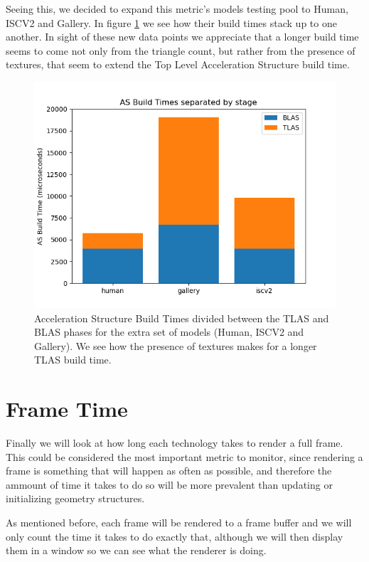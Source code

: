 Seeing this, we decided to expand this metric's models testing pool to Human, ISCV2 and Gallery. In figure \ref{as-extra-build-time-decomposed} we see how their build times stack up to one another. In sight of these new data points we appreciate that a longer build time seems to come not only from the triangle count, but rather from the presence of textures, that seem to extend the Top Level Acceleration Structure build time.


\begin{figure}[hbt!]
    \centering
    \includegraphics[width=1.0\textwidth]{figuras/optix-extra-accelbuildtimes-decomposed.png}
    \caption{Acceleration Structure Build Times divided between the TLAS and BLAS phases for the extra set of models (Human, ISCV2 and Gallery). We see how the presence of textures makes for a longer TLAS build time.}
    \label{as-extra-build-time-decomposed}
\end{figure}


\clearpage
\section{Frame Time}
Finally we will look at how long each technology takes to render a full frame. This could be considered the most important metric to monitor, since rendering a frame is something that will happen as often as possible, and therefore the ammount of time it takes to do so will be more prevalent than updating or initializing geometry structures.

As mentioned before, each frame will be rendered to a frame buffer and we will only count the time it takes to do exactly that, although we will then display them in a window so we can see what the renderer is doing.

